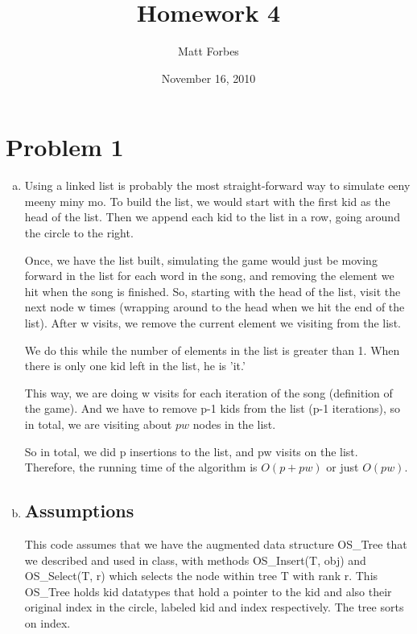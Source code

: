 \documentclass[a4paper,12pt]{article}
\begin{document}
\title{Homework 4}
\author{Matt Forbes}
\date{November 16, 2010}
\maketitle

\section*{Problem 1}


\begin{enumerate}[a)]
  \item 

    Using a linked list is probably the most straight-forward way to
    simulate eeny meeny miny mo. To build the list, we would start
    with the first kid as the head of the list. Then we append each
    kid to the list in a row, going around the circle to the right.

    \noindent Once, we have the list built, simulating the game would
    just be moving forward in the list for each word in the song, and
    removing the element we hit when the song is finished. So,
    starting with the head of the list, visit the next node w times
    (wrapping around to the head when we hit the end of the
    list). After w visits, we remove the current element we 
    visiting from the list.

    \noindent We do this while the number of elements in the list is
    greater than 1. When there is only one kid left in the list, he is
    'it.'

    \noindent This way, we are doing w visits for each iteration of
    the song (definition of the game). And we have to remove p-1 kids
    from the list (p-1 iterations), so in total, we are visiting
    about \(pw\) nodes in the list.
    
    \noindent So in total, we did p insertions to the list, and pw
    visits on the list. Therefore, the running time of the algorithm
    is \(O(p + pw)\) or just \(O(pw)\).


  \item
    
\subsection*{Assumptions}

    This code assumes that we have the augmented data structure
    OS\_Tree that we described and used in class, with methods
    OS\_Insert(T, obj) and OS\_Select(T, r) which selects the node
    within tree T with rank r. This OS\_Tree holds kid datatypes that
    hold a pointer to the kid and also their original index in the
    circle, labeled kid and index respectively. The tree sorts on
    index.
    

\end{enumerate}
\end{document}
